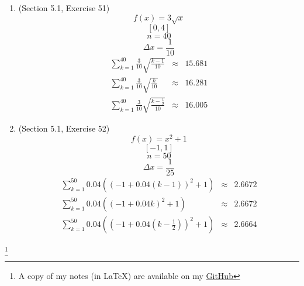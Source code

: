 \documentclass{article}
\newcommand\blfootnote[1]{
    \begingroup
    \renewcommand\thefootnote{}\footnote{#1}
    \addtocounter{footnote}{-1}
    \endgroup
}
\begin{document}
\begin{enumerate}
    \item (Section 5.1, Exercise 51)
        $$f(x) = 3\sqrt{x}$$
        $$[0,4]$$
        $$n = 40$$
        $$\Delta{x} = \frac{1}{10}$$
        \begin{eqnarray}
            \sum_{k = 1}^{40}{\frac{3}{10}\sqrt{\frac{k - 1}{10}}} &\approx& 15.681 \\
            \sum_{k = 1}^{40}{\frac{3}{10}\sqrt{\frac{k}{10}}} &\approx& 16.281 \\
            \sum_{k = 1}^{40}{\frac{3}{10}\sqrt{\frac{k - \frac{1}{2}}{10}}} &\approx& 16.005
        \end{eqnarray}
    \item (Section 5.1, Exercise 52)
        $$f(x) = x^2 + 1$$
        $$[-1,1]$$
        $$n = 50$$
        $$\Delta{x} = \frac{1}{25}$$
        \begin{eqnarray}
            \sum_{k = 1}^{50}{0.04\left(\left(-1 + 0.04\left(k - 1\right)\right)^2 + 1\right)} &\approx& 2.6672 \\
            \sum_{k = 1}^{50}{0.04\left(\left(-1 + 0.04k\right)^2 + 1\right)} &\approx& 2.6672 \\
            \sum_{k = 1}^{50}{0.04\left(\left(-1 + 0.04\left(k - \frac{1}{2}\right)\right)^2 + 1\right)} &\approx& 2.6664
        \end{eqnarray}
\end{enumerate}

\blfootnote{A copy of my notes (in \LaTeX) are available on my \href{https://github.com/onlinechronically/MATH-211}{GitHub}}
\end{document}
